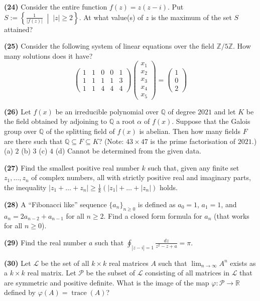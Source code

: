 \documentclass[11pt,a4paper]{article}
\newcommand{\Z}{\mathbb{Z}}
\newcommand{\Q}{\mathbb{Q}}
\newcommand{\R}{\mathbb{R}}
\newcommand{\qitem}[1]{\par\medskip\noindent\textbf{#1}\hspace{0.5em}}
\begin{document}
\qitem{(24)} Consider the entire function $f(z) = z(z - i)$. Put $S := \left\{\frac{1}{|f(z)|} \;\middle|\; |z| \ge 2\right\}$. At what value(s) of $z$ is the maximum of the set $S$ attained?

\qitem{(25)} Consider the following system of linear equations over the field $\Z/5\Z$. How many solutions does it have?
\[
  \begin{pmatrix} 1 & 1 & 0 & 0 & 1 \\ 1 & 1 & 1 & 1 & 3 \\ 1 & 1 & 4 & 4 & 4 \end{pmatrix}
  \begin{pmatrix} x_1 \\ x_2 \\ x_3 \\ x_4 \\ x_5 \end{pmatrix} =
  \begin{pmatrix} 1 \\ 0 \\ 2 \end{pmatrix}
\]

\qitem{(26)} Let $f(x)$ be an irreducible polynomial over $\Q$ of degree $2021$ and let $K$ be the field obtained by adjoining to $\Q$ a root $\alpha$ of $f(x)$. Suppose that the Galois group over $\Q$ of the splitting field of $f(x)$ is abelian. Then how many fields $F$ are there such that $\Q \subseteq F \subseteq K$? (Note: $43 \times 47$ is the prime factorisation of $2021$.)\\
(a) $2$ \qquad (b) $3$ \qquad (c) $4$ \qquad (d) Cannot be determined from the given data.

\qitem{(27)} Find the smallest positive real number $k$ such that, given any finite set $z_1, \dots, z_n$ of complex numbers, all with strictly positive real and imaginary parts, the inequality $|z_1 + \dots + z_n| \ge \frac{1}{k}(|z_1| + \dots + |z_n|)$ holds.

\qitem{(28)} A ``Fibonacci like'' sequence $\{a_n\}_{n \ge 0}$ is defined as $a_0 = 1$, $a_1 = 1$, and $a_n = 2a_{n-2} + a_{n-1}$ for all $n \ge 2$. Find a closed form formula for $a_n$ (that works for all $n \ge 0$).

\qitem{(29)} Find the real number $a$ such that $\displaystyle\oint_{|z-i|=1} \frac{dz}{z^2 - z + a} = \pi$.

\qitem{(30)} Let $\mathcal{L}$ be the set of all $k \times k$ real matrices $A$ such that $\lim_{n \to \infty} A^n$ exists as a $k \times k$ real matrix. Let $\mathcal{P}$ be the subset of $\mathcal{L}$ consisting of all matrices in $\mathcal{L}$ that are symmetric and positive definite. What is the image of the map $\varphi : \mathcal{P} \to \R$ defined by $\varphi(A) = \operatorname{trace}(A)$?
\end{document}
